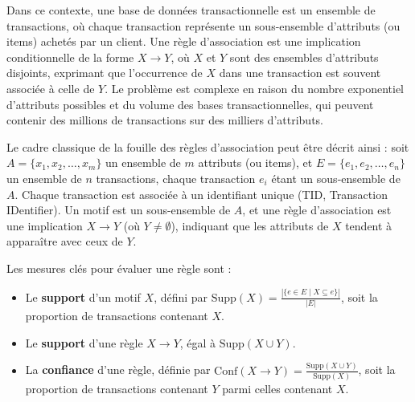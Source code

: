 \documentclass[a4paper,14pt]{article}
\begin{document}
        Dans ce contexte, une base de données transactionnelle est un ensemble de transactions, où chaque transaction représente un sous-ensemble d’attributs (ou items) achetés par un client. Une règle d’association est une implication conditionnelle de la forme \( X \rightarrow Y \), où \( X \) et \( Y \) sont des ensembles d’attributs disjoints, exprimant que l’occurrence de \( X \) dans une transaction est souvent associée à celle de \( Y \). Le problème est complexe en raison du nombre exponentiel d’attributs possibles et du volume des bases transactionnelles, qui peuvent contenir des millions de transactions sur des milliers d’attributs.
        
        
        \label{sec:prob_assoc}
        
        Le cadre classique de la fouille des règles d’association peut être décrit ainsi : soit \( A = \{x_1, x_2, \dots, x_m\} \) un ensemble de \( m \) attributs (ou items), et \( E = \{e_1, e_2, \dots, e_n\} \) un ensemble de \( n \) transactions, chaque transaction \( e_i \) étant un sous-ensemble de \( A \). Chaque transaction est associée à un identifiant unique (TID, Transaction IDentifier). Un motif est un sous-ensemble de \( A \), et une règle d’association est une implication \( X \rightarrow Y \) (où \( Y \neq \emptyset \)), indiquant que les attributs de \( X \) tendent à apparaître avec ceux de \( Y \).
        
        Les mesures clés pour évaluer une règle sont :
        \begin{itemize}
            \item Le \textbf{support} d’un motif \( X \), défini par \( \text{Supp}(X) = \frac{|\{e \in E \mid X \subseteq e\}|}{|E|} \), soit la proportion de transactions contenant \( X \).
            \item Le \textbf{support} d’une règle \( X \rightarrow Y \), égal à \( \text{Supp}(X \cup Y) \).
            \item La \textbf{confiance} d’une règle, définie par \( \text{Conf}(X \rightarrow Y) = \frac{\text{Supp}(X \cup Y)}{\text{Supp}(X)} \), soit la proportion de transactions contenant \( Y \) parmi celles contenant \( X \).
        \end{itemize}
        
\end{document}
